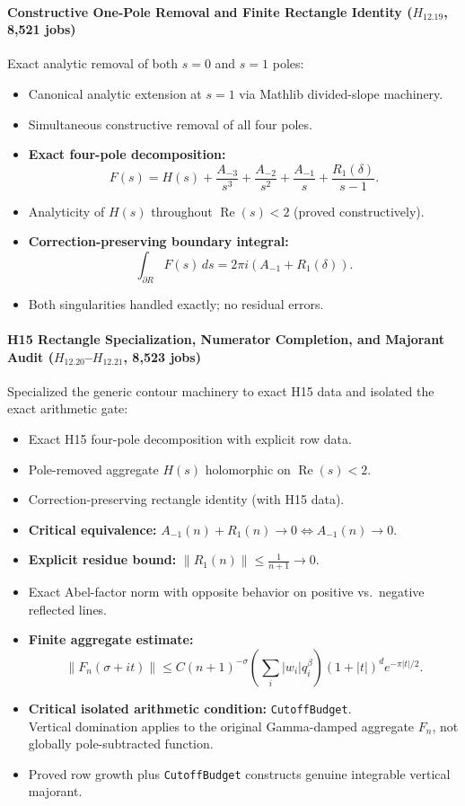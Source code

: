 \documentclass[11pt,a4paper]{article}
\theoremstyle{plain}
\theoremstyle{definition}
\theoremstyle{remark}
\DeclareMathOperator{\RePart}{Re}
\renewcommand{\Re}{\RePart}
\begin{document}
\paragraph{Constructive One-Pole Removal and Finite Rectangle Identity ($H_{12.19}$, 8,521 jobs)}

Exact analytic removal of both $s=0$ and $s=1$ poles:
\begin{itemize}[leftmargin=2em]
  \item Canonical analytic extension at $s=1$ via Mathlib divided-slope machinery.
  \item Simultaneous constructive removal of all four poles.
  \item \textbf{Exact four-pole decomposition:}
  \[
    F(s) = H(s) + \frac{A_{-3}}{s^3} + \frac{A_{-2}}{s^2} + \frac{A_{-1}}{s} + \frac{R_1(\delta)}{s-1}.
  \]
  \item Analyticity of $H(s)$ throughout $\Re(s) < 2$ (proved constructively).
  \item \textbf{Correction-preserving boundary integral:}
  \[
    \int_{\partial R} F(s)\,ds = 2\pi i(A_{-1} + R_1(\delta)).
  \]
  \item Both singularities handled exactly; no residual errors.
\end{itemize}

\paragraph{H15 Rectangle Specialization, Numerator Completion, and Majorant Audit ($H_{12.20}$--$H_{12.21}$, 8,523 jobs)}

Specialized the generic contour machinery to exact H15 data and isolated the exact arithmetic gate:
\begin{itemize}[leftmargin=2em]
  \item Exact H15 four-pole decomposition with explicit row data.
  \item Pole-removed aggregate $H(s)$ holomorphic on $\Re(s) < 2$.
  \item Correction-preserving rectangle identity (with H15 data).
  \item \textbf{Critical equivalence:} $A_{-1}(n) + R_1(n) \to 0 \iff A_{-1}(n) \to 0$.
  \item \textbf{Explicit residue bound:} $\|R_1(n)\| \le \frac{1}{n+1} \to 0$.
  \item Exact Abel-factor norm with opposite behavior on positive vs.\ negative reflected lines.
  \item \textbf{Finite aggregate estimate:}
  \[
    \|F_n(\sigma+it)\| \le C(n+1)^{-\sigma} \left(\sum_i |w_i|q_i^\beta\right) (1+|t|)^d e^{-\pi|t|/2}.
  \]
  \item \textbf{Critical isolated arithmetic condition:} \texttt{CutoffBudget}. \\
    Vertical domination applies to the original Gamma-damped aggregate $F_n$, not globally pole-subtracted function.
  \item Proved row growth plus \texttt{CutoffBudget} constructs genuine integrable vertical majorant.
\end{itemize}
\end{document}
